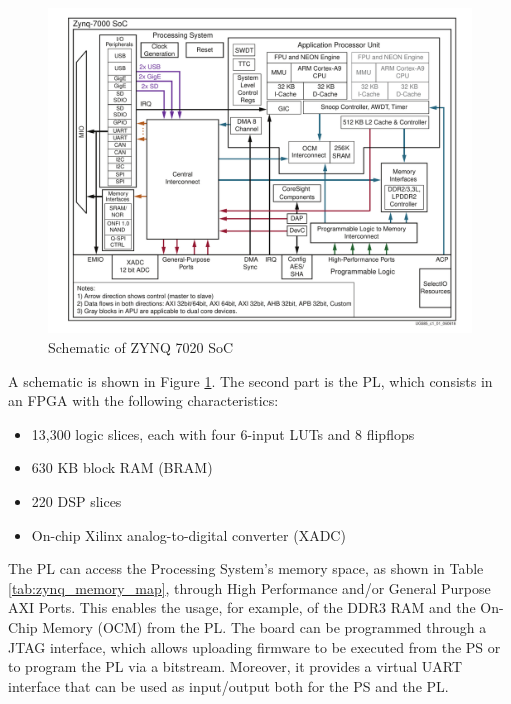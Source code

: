 \begin{figure}[H]
\centering
\includegraphics[width=1.0\linewidth]{images/chapter3/zynq.pdf}
\caption{Schematic of ZYNQ 7020 SoC}
\label{fig:zynq7020}
\end{figure}

A schematic is shown in Figure \ref{fig:zynq7020}. The second part is the PL, which consists in an FPGA with the following characteristics:

\begin{itemize}
    \item 13,300 logic slices, each with four 6-input LUTs and 8 flipflops
    \item 630 KB block RAM (BRAM)
    \item 220 DSP slices
    \item On-chip Xilinx analog-to-digital converter (XADC)
\end{itemize}

The PL can access the Processing System's memory space, as shown in Table \ref{tab:zynq_memory_map}, through High Performance and/or General Purpose AXI Ports. This enables the usage, for example, of the DDR3 RAM and the On-Chip Memory (OCM) from the PL. The board can be programmed through a JTAG interface, which allows uploading firmware to be executed from the PS or to program the PL via a bitstream. Moreover, it provides a virtual UART interface that can be used as input/output both for the PS and the PL.\bigskip

